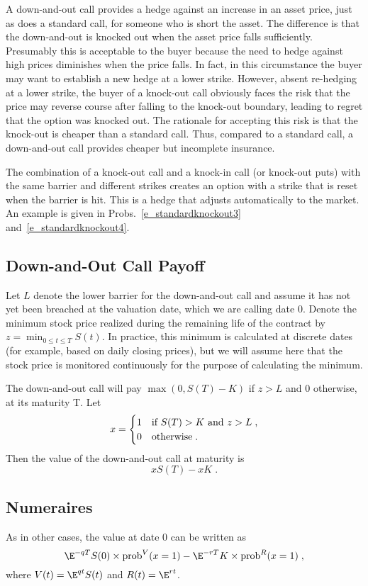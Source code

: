 A down-and-out call provides a hedge against an increase in an asset price, just as does a standard call, for someone who is short the asset.  The difference is that the down-and-out is knocked out when the asset price falls sufficiently.  Presumably this is acceptable to the buyer because the need to hedge against high prices diminishes when the price falls.  In fact, in this circumstance the buyer may want  to establish a new hedge at a lower strike.  However, absent re-hedging at a lower strike, the buyer of a knock-out call obviously faces the risk that the price may reverse course after falling to the knock-out boundary, leading to regret that the option was knocked out.  The rationale for accepting this risk is  that the knock-out is cheaper than a standard call.  Thus, compared to a standard call, a down-and-out call provides cheaper but incomplete insurance.

The combination of a knock-out call and a knock-in call (or knock-out puts) with the same barrier and different strikes creates an option with a strike that is reset when the barrier is hit.  This is a hedge that adjusts automatically to the market.  An example is given in Probs.~\ref{e_standardknockout3} and~\ref{e_standardknockout4}.

\subsection*{Down-and-Out Call Payoff}
Let $L$ denote the lower barrier for the down-and-out call and assume it has not yet been breached at the valuation date, which we are calling date 0.  Denote the minimum stock price realized during the remaining life of the contract by $z = \min_{0\leq t\leq T} S(t)$.  In practice, this minimum is calculated at discrete dates (for example, based on daily closing prices), but we will assume here that the stock price is monitored continuously for the purpose of calculating the minimum. 

The down-and-out call will pay $\max(0,S(T)-K)$ if $z > L$ and 0 otherwise, 
at its maturity T.  
Let
$$x = \begin{cases} 1 & \text{if $S(T)>K$ and $z > L$\;,}\\
0 & \text{otherwise\;.} \end{cases}$$
Then the value of the down-and-out call at maturity is
$$xS(T) - xK\; .$$

\subsection*{Numeraires}
As in other cases, the value at date 0 can be written as
$$\E^{-qT}S(0)\times\text{prob}^{V}(x=1) - \E^{-rT}K\times\text{prob}^{R}(x=1)\; ,$$
where $V(t) = \E^{qt}S(t)$ and $R(t)=\E^{rt}$.


